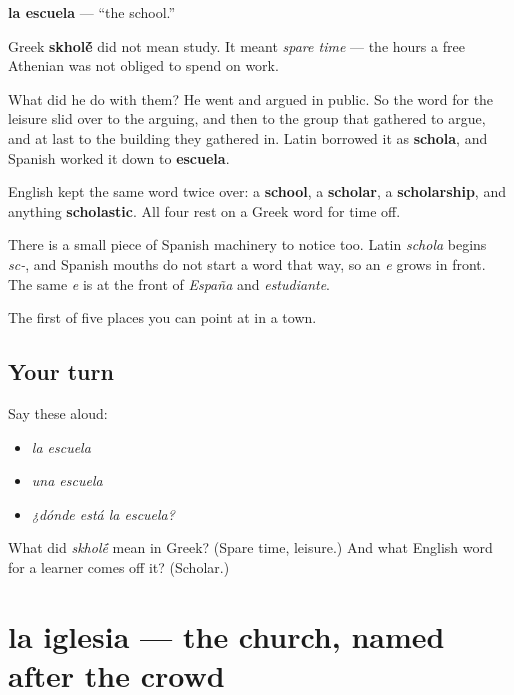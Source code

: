 \begin{cousinweb}
\textbf{la escuela} — \textquotedblleft{}the school.\textquotedblright{}

Greek \textbf{skhol\'{\={e}}} did not mean study. It meant \emph{spare time} — the hours a free Athenian was not obliged to spend on work.

What did he do with them? He went and argued in public. So the word for the leisure slid over to the arguing, and then to the group that gathered to argue, and at last to the building they gathered in. Latin borrowed it as \textbf{schola}, and Spanish worked it down to \textbf{escuela}.

English kept the same word twice over: a \textbf{school}, a \textbf{scholar}, a \textbf{scholarship}, and anything \textbf{scholastic}. All four rest on a Greek word for time off.

There is a small piece of Spanish machinery to notice too. Latin \emph{schola} begins \emph{sc-}, and Spanish mouths do not start a word that way, so an \emph{e} grows in front. The same \emph{e} is at the front of \emph{España} and \emph{estudiante}.
\end{cousinweb}

\begin{grammarlens}[title={What you've built}]
The first of five places you can point at in a town.
\end{grammarlens}

\subsection*{Your turn}
Say these aloud:

\begin{itemize}
\raggedright
  \item \emph{la escuela}
  \item \emph{una escuela}
  \item \emph{¿dónde está la escuela?}
\end{itemize}

\begin{tcolorbox}[breakable,colback=teal!4,colframe=teal!35!black,title={Before you move on}]
What did \emph{skhol\'{\={e}}} mean in Greek? (Spare time, leisure.) And what English word for a learner comes off it? (Scholar.)
\end{tcolorbox}
\section[la iglesia]{la iglesia — the church, named after the crowd}

